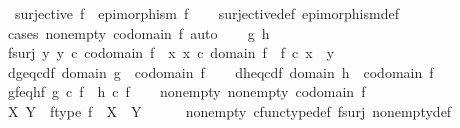 \begin{isabellebody}
\ \ {\isachardoublequoteopen}surjective\ f\ {\isasymLongrightarrow}\ epimorphism\ f{\isachardoublequoteclose}\isanewline
%
\isadelimproof
\ \ %
\endisadelimproof
%
\isatagproof
{}\isamarkupfalse%
\ surjective{\isacharunderscore}{\kern0pt}def\ epimorphism{\isacharunderscore}{\kern0pt}def\isanewline
{}\isamarkupfalse%
\ {\isacharparenleft}{\kern0pt}cases\ {\isachardoublequoteopen}nonempty\ {\isacharparenleft}{\kern0pt}codomain\ f{\isacharparenright}{\kern0pt}{\isachardoublequoteclose}{\isacharcomma}{\kern0pt}\ auto{\isacharparenright}{\kern0pt}\isanewline
\ \ \isamarkupfalse%
\ g\ h\isanewline
\ \ \isamarkupfalse%
\ f{\isacharunderscore}{\kern0pt}surj{\isacharcolon}{\kern0pt}\ {\isachardoublequoteopen}{\isasymforall}y{\isachardot}{\kern0pt}\ y\ {\isasymin}\isactrlsub c\ codomain\ f\ {\isasymlongrightarrow}\ {\isacharparenleft}{\kern0pt}{\isasymexists}x{\isachardot}{\kern0pt}\ x\ {\isasymin}\isactrlsub c\ domain\ f\ {\isasymand}\ f\ {\isasymcirc}\isactrlsub c\ x\ {\isacharequal}{\kern0pt}\ y{\isacharparenright}{\kern0pt}{\isachardoublequoteclose}\isanewline
\ \ \isamarkupfalse%
\ d{\isacharunderscore}{\kern0pt}g{\isacharunderscore}{\kern0pt}eq{\isacharunderscore}{\kern0pt}cd{\isacharunderscore}{\kern0pt}f{\isacharcolon}{\kern0pt}\ {\isachardoublequoteopen}domain\ g\ {\isacharequal}{\kern0pt}\ codomain\ f{\isachardoublequoteclose}\isanewline
\ \ \isamarkupfalse%
\ d{\isacharunderscore}{\kern0pt}h{\isacharunderscore}{\kern0pt}eq{\isacharunderscore}{\kern0pt}cd{\isacharunderscore}{\kern0pt}f{\isacharcolon}{\kern0pt}\ {\isachardoublequoteopen}domain\ h\ {\isacharequal}{\kern0pt}\ codomain\ f{\isachardoublequoteclose}\isanewline
\ \ \isamarkupfalse%
\ gf{\isacharunderscore}{\kern0pt}eq{\isacharunderscore}{\kern0pt}hf{\isacharcolon}{\kern0pt}\ {\isachardoublequoteopen}g\ {\isasymcirc}\isactrlsub c\ f\ {\isacharequal}{\kern0pt}\ h\ {\isasymcirc}\isactrlsub c\ f{\isachardoublequoteclose}\isanewline
\ \ \isamarkupfalse%
\ nonempty{\isacharcolon}{\kern0pt}\ {\isachardoublequoteopen}nonempty\ {\isacharparenleft}{\kern0pt}codomain\ f{\isacharparenright}{\kern0pt}{\isachardoublequoteclose}\isanewline
\isanewline
\ \ \isamarkupfalse%
\ X\ Y\ \ f{\isacharunderscore}{\kern0pt}type{\isacharcolon}{\kern0pt}\ {\isachardoublequoteopen}f\ {\isacharcolon}{\kern0pt}\ X\ {\isasymrightarrow}\ Y{\isachardoublequoteclose}\isanewline
\ \ \ \ \isamarkupfalse%
\ nonempty\ cfunc{\isacharunderscore}{\kern0pt}type{\isacharunderscore}{\kern0pt}def\ f{\isacharunderscore}{\kern0pt}surj\ nonempty{\isacharunderscore}{\kern0pt}def\ \isamarkupfalse%

\end{isabellebody}
